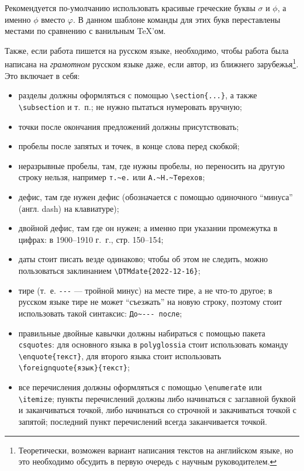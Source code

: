 Рекомендуется по-умол\-ча\-нию использовать красивые греческие бук\-вы $\sigma$  и $\phi$, а именно $\phi$ вместо $\varphi$. В данном шаблоне команды для этих букв переставлены местами по сравнению с ванильным \TeX'ом.

Также, если работа пишется на русском языке, необходимо, чтобы работа была написана на \textit{грамотном} русском языке даже, если автор, из ближнего зарубежья\footnote{
Теоретически, возможен вариант написания текстов на английском языке, но это необходимо обсудить в первую очередь с научным руководителем.}.
Это включает в себя:
\begin{itemize}
  \item разделы должны оформляться с помощью \verb=\section{...}=, а также \verb=\subsection= и т.~п.; не нужно пытаться нумеровать вручную;
  \item точки после окончания предложений должны присутствовать;
  \item пробелы после запятых  и точек, в конце слова перед скобкой;
  \item неразрывные пробелы, там, где нужны пробелы, но переносить на другую строку нельзя, например \verb=т.~е.= или \verb=А.~Н.~Терехов=;
  \item дефис, там где нужен дефис (обозначается с помощью одиночного \enquote{минуса} (англ. dash) на клавиатуре);
  \item двойной дефис, там где он нужен; а именно  при указании проме\-жутка в цифрах: в 1900--1910 г.~г., стр. 150--154;
  \item даты стоит писать везде одинаково; чтобы об этом не следить, можно пользоваться заклинанием \verb=\DTMdate{2022-12-16}=;
  \item тире (т.~е. \verb=---= --- тройной минус) на месте тире, а не что-то другое; в русском языке тире не может \enquote{съезжать} на новую строку, поэтому стоит использовать такой синтаксис: \verb=До~--- после=;
  \item правильные двойные кавычки должны набираться с помощью пакета \texttt{csquotes}: для основного языка в \texttt{polyglossia} стоит использовать команду \verb=\enquote{текст}=, для второго языка стоит использовать \verb=\foreignquote{язык}{текст}=;
  \item все перечисления должны оформляться с помощью \verb=\enumerate= или \verb=\itemize=; пункты перечислений должны либо начинаться с заглавной буквой и заканчиваться точкой, либо начинаться со строчной и закачиваться точкой с запятой; последний пункт пере\-числений всегда заканчивается точкой.

\end{itemize}
